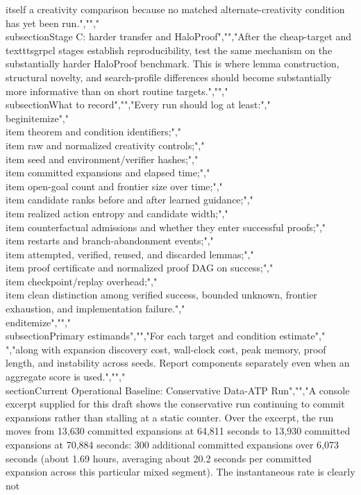 {{{itself a creativity comparison because no matched alternate-creativity condition has yet been run.","","\\subsection{Stage C: harder transfer and HaloProof}","","After the cheap-target and \\texttt{sgrpcl} stages establish reproducibility, test the same mechanism on the substantially harder HaloProof benchmark. This is where lemma construction, structural novelty, and search-profile differences should become substantially more informative than on short routine targets.","","\\subsection{What to record}","","Every run should log at least:","\\begin{itemize}","\\item theorem and condition identifiers;","\\item raw and normalized creativity controls;","\\item seed and environment/verifier hashes;","\\item committed expansions and elapsed time;","\\item open-goal count and frontier size over time;","\\item candidate ranks before and after learned guidance;","\\item realized action entropy and candidate width;","\\item counterfactual admissions and whether they enter successful proofs;","\\item restarts and branch-abandonment events;","\\item attempted, verified, reused, and discarded lemmas;","\\item proof certificate and normalized proof DAG on success;","\\item checkpoint/replay overhead;","\\item clean distinction among verified success, bounded unknown, frontier exhaustion, and implementation failure.","\\end{itemize}","","\\subsection{Primary estimands}","","For each target and condition estimate","\\[","D,\\qquad N,\\qquad \\cY=DN,\\qquad \\operatorname{ACE}_T,","\\]","along with expansion discovery cost, wall-clock cost, peak memory, proof length, and instability across seeds. Report components separately even when an aggregate score is used.","","\\section{Current Operational Baseline: Conservative Data-ATP Run}","","A console excerpt supplied for this draft shows the conservative run continuing to commit expansions rather than stalling at a static counter. Over the excerpt, the run moves from 13,630 committed expansions at 64,811 seconds to 13,930 committed expansions at 70,884 seconds: 300 additional committed expansions over 6,073 seconds (about 1.69 hours, averaging about 20.2 seconds per committed expansion across this particular mixed segment). The instantaneous rate is clearly not }}}
